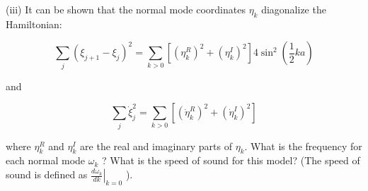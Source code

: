 \documentclass[12pt]{article}
\begin{document}
(iii) It can be shown that the normal mode coordinates $\eta_{k}$ diagonalize the Hamiltonian:


\begin{equation*}
\sum_{j}\left(\xi_{j+1}-\xi_{j}\right)^{2}=\sum_{k>0}\left[\left(\eta_{k}^{R}\right)^{2}+\left(\eta_{k}^{I}\right)^{2}\right] 4 \sin ^{2}\left(\frac{1}{2} k a\right) \tag{8}
\end{equation*}


and


\begin{equation*}
\sum_{j} \dot{\xi}_{j}^{2}=\sum_{k>0}\left[\left(\dot{\eta}_{k}^{R}\right)^{2}+\left(\dot{\eta}_{k}^{I}\right)^{2}\right] \tag{9}
\end{equation*}


where $\eta_{k}^{R}$ and $\eta_{k}^{I}$ are the real and imaginary parts of $\eta_{k}$. What is the frequency for each normal mode $\omega_{k}$ ? What is the speed of sound for this model? (The speed of sound is defined as $\left.\frac{d \omega_{k}}{d k}\right|_{k=0}$ ).
\end{document}
